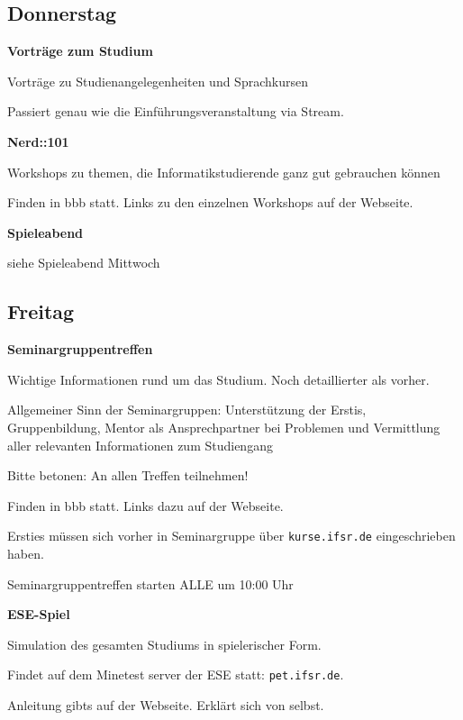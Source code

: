 \documentclass[a4paper,12pt]{scrreprt}
\begin{document}
\subsection{Donnerstag}
\textbf{Vorträge zum Studium}
\begin{itemize*}
    \item Vorträge zu Studienangelegenheiten und Sprachkursen
    \item Passiert genau wie die Einführungsveranstaltung via Stream.
\end{itemize*}

\textbf{Nerd::101}
\begin{itemize*}
    \item Workshops zu themen, die Informatikstudierende ganz gut gebrauchen können
    \item Finden in bbb statt. Links zu den einzelnen Workshops auf der Webseite.
\end{itemize*}

\textbf{Spieleabend}
\begin{itemize*}
    \item siehe Spieleabend Mittwoch
\end{itemize*}

\pagebreak

\subsection{Freitag}
\textbf{Seminargruppentreffen}
\begin{itemize*}
    \item Wichtige Informationen rund um das Studium. Noch detaillierter als vorher.
    \item Allgemeiner Sinn der Seminargruppen: Unterstützung der Erstis, Gruppenbildung, Mentor als Ansprechpartner bei Problemen und Vermittlung aller relevanten Informationen zum Studiengang
    \item Bitte betonen: An allen Treffen teilnehmen!
    \item Finden in bbb statt. Links dazu auf der Webseite.
    \item Ersties müssen sich vorher in Seminargruppe über \texttt{kurse.ifsr.de} eingeschrieben haben.
    \item Seminargruppentreffen starten ALLE um 10:00 Uhr
\end{itemize*}

\textbf{ESE-Spiel}
\begin{itemize*}
    \item Simulation des gesamten Studiums in spielerischer Form.
    \item Findet auf dem Minetest server der ESE statt: \texttt{pet.ifsr.de}.
    \item Anleitung gibts auf der Webseite. Erklärt sich von selbst.
\end{itemize*}
\end{document}
